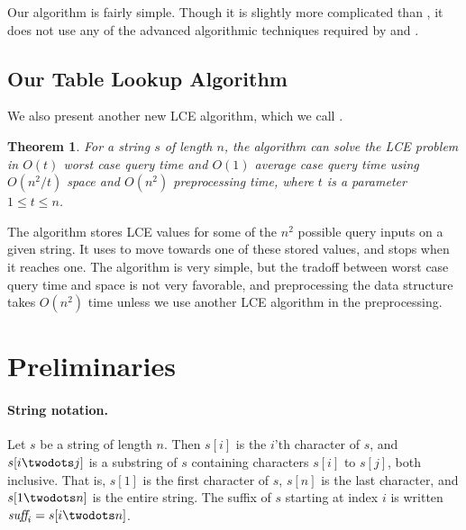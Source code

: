 \documentclass[a4]{article}
\newtheorem{theorem}{Theorem}
\begin{document}
Our algorithm is fairly simple. Though it is slightly more complicated than , it does not use any of the advanced algorithmic techniques required by  and .

\ifreport

\subsection{Our Table Lookup Algorithm}

We also present another new LCE algorithm, which we call .

\begin{theorem}
For a string $s$ of length $n$, the  algorithm can solve the LCE problem in $O(t)$ worst case query time and $O(1)$ average case query time using $O(n^2/t)$ space and $O(n^2)$ preprocessing time, where $t$ is a parameter $1 \leq t \leq n$.
\end{theorem}

The algorithm stores LCE values for some of the $n^2$ possible query inputs on a given string. It uses  to move towards one of these stored values, and stops when it reaches one. The  algorithm is very simple, but the tradoff between worst case query time and space is not very favorable, and preprocessing the data structure takes $O(n^2)$ time unless we use another LCE algorithm in the preprocessing.

\fi %

\section{Preliminaries}

\paragraph{String notation.} Let $s$ be a string of length $n$. Then $s[i]$ is the $i$'th character of $s$, and $s[i\twodots j]$ is a substring of $s$ containing characters $s[i]$ to $s[j]$, both inclusive. That is, $s[1]$ is the first character of $s$, $s[n]$ is the last character, and $s[1\twodots n]$ is the entire string. The suffix of $s$ starting at index $i$ is written $\suff_i = s[i\twodots n]$.
\end{document}
